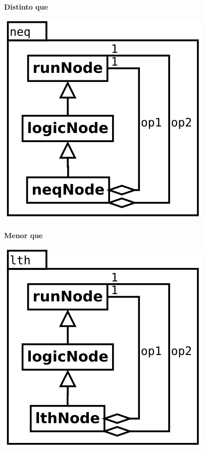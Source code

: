 \paragraph {Distinto que}
\begin{center}
\includegraphics[scale=0.4]{neq.png} \\
\end{center}

\paragraph {Menor que}
\begin{center}
\includegraphics[scale=0.4]{lth.png} \\
\end{center}

